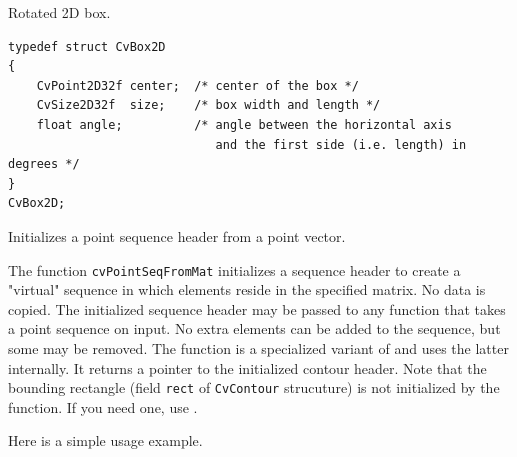 \ifC
{}\label{CvBox2D}

Rotated 2D box.

\begin{lstlisting}
typedef struct CvBox2D
{
    CvPoint2D32f center;  /* center of the box */
    CvSize2D32f  size;    /* box width and length */
    float angle;          /* angle between the horizontal axis
                             and the first side (i.e. length) in degrees */
}
CvBox2D;
\end{lstlisting}
\fi

\ifC
{}\label{PointSeqFromMat}

Initializes a point sequence header from a point vector.


\begin{description}
\end{description}

The function \texttt{cvPointSeqFromMat} initializes a sequence
header to create a "virtual" sequence in which elements reside in
the specified matrix. No data is copied. The initialized sequence
header may be passed to any function that takes a point sequence
on input. No extra elements can be added to the sequence,
but some may be removed. The function is a specialized variant of
 and uses
the latter internally. It returns a pointer to the initialized contour
header. Note that the bounding rectangle (field \texttt{rect} of
\texttt{CvContour} strucuture) is not initialized by the function. If
you need one, use .

Here is a simple usage example.

